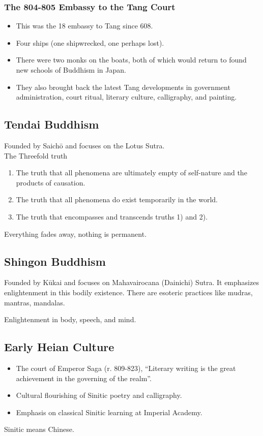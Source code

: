 \documentclass[class=article, crop=false]{standalone}
\begin{document}
  \subsubsection{The 804-805 Embassy to the Tang Court}
  \begin{itemize}
    \item This was the 18 embassy to Tang since $608$.
    \item Four ships (one shipwrecked, one perhaps lost).
    \item There were two monks on the boats, both of which would return to found new schools of Buddhism in Japan.
    \item They also brought back the latest Tang developments in government administration, court ritual, literary culture, calligraphy, and painting.
  \end{itemize}
  \subsection{Tendai Buddhism}
  Founded by Saich\=o and focuses on the Lotus Sutra. \\[10pt]
  The Threefold truth
  \begin{enumerate}
    \item The truth that all phenomena are ultimately empty of self-nature and the products of causation.
    \item The truth that all phenomena do exist temporarily in the world.
    \item The truth that encompasses and transcends truths 1) and 2).
  \end{enumerate}
  \begin{note}{}
    Everything fades away, nothing is permanent.
  \end{note}
  \subsection{Shingon Buddhism}
  Founded by K\=ukai and focuses on Mahavairocana (Dainichi) Sutra. It emphasizes enlightenment in this bodily existence. There are esoteric practices like mudras, mantras, mandalas.
  \begin{note}{}
    Enlightenment in body, speech, and mind.
  \end{note}
  \subsection{Early Heian Culture}
  \begin{itemize}
    \item The court of Emperor Saga (r. 809-823), ``Literary writing is the great achievement in the governing of the realm''.
    \item Cultural flourishing of Sinitic poetry and calligraphy.
    \item Emphasis on classical Sinitic learning at Imperial Academy.
  \end{itemize}
  Sinitic means Chinese.
\end{document}
